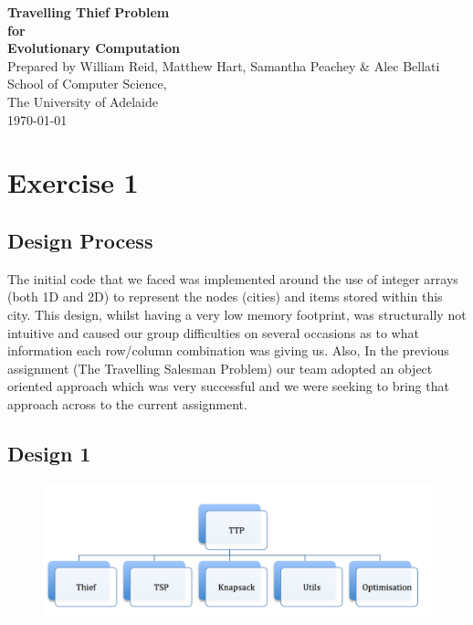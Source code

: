 \documentclass[a4paper,12pt]{article}
\begin{document}
\begin{titlepage}
\begin{center}
\vspace*{3cm}
{\LARGE\bf Travelling Thief Problem}\\
\vspace{1.5cm}
{\large\bf for}\\
\vspace{1.5cm}
{\LARGE\bf Evolutionary Computation}\\
\vspace{5cm}
Prepared by William Reid, Matthew Hart, Samantha Peachey \& Alec Bellati\\
\vspace{1cm}
School of Computer Science,\\
The University of Adelaide\\
\vspace{1cm}
\today
\end{center}
\end{titlepage}



\section*{Exercise 1}
\subsection*{Design Process}
The initial code that we faced was implemented around the use of integer arrays (both 1D and 2D) to represent the nodes (cities) and items stored within this city. This design, whilst having a very low memory footprint, was structurally not intuitive and caused our group difficulties on several occasions as to what information each row/column combination was giving us. Also, In the previous assignment (The Travelling Salesman Problem) our team adopted an object oriented approach which was very successful and we were seeking to bring that approach across to the current assignment.

\subsection*{Design 1}
\begin{figure}[h]
\centering
\includegraphics[width=120mm]{design1.png}
\end{figure}
\end{document}
